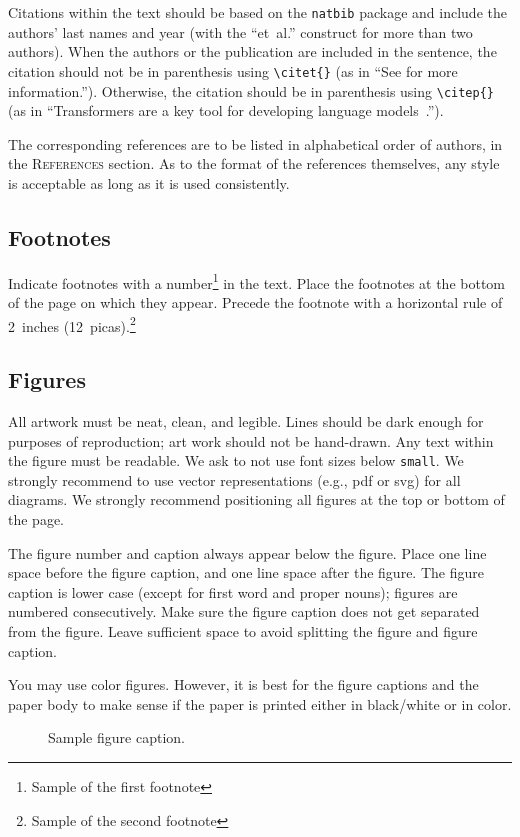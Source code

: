\documentclass{article} %
\begin{document}
Citations within the text should be based on the \texttt{natbib} package
and include the authors' last names and year (with the ``et~al.'' construct
for more than two authors). When the authors or the publication are
included in the sentence, the citation should not be in parenthesis using \verb|\citet{}| (as
in ``See \citet{Vaswani+2017} for more information.''). Otherwise, the citation
should be in parenthesis using \verb|\citep{}| (as in ``Transformers are a key tool
for developing language models~\citep{Vaswani+2017}.'').

The corresponding references are to be listed in alphabetical order of
authors, in the \textsc{References} section. As to the format of the
references themselves, any style is acceptable as long as it is used
consistently.

\subsection{Footnotes}

Indicate footnotes with a number\footnote{Sample of the first footnote} in the
text. Place the footnotes at the bottom of the page on which they appear.
Precede the footnote with a horizontal rule of 2~inches
(12~picas).\footnote{Sample of the second footnote}

\subsection{Figures}

All artwork must be neat, clean, and legible. Lines should be dark
enough for purposes of reproduction; art work should not be
hand-drawn. Any text within the figure must be readable. We ask to not use font sizes below {\tt small}. We strongly recommend to use vector representations (e.g., pdf or svg) for all diagrams. 
We strongly recommend positioning all figures at the top or bottom of the page.

The figure number and caption always appear below the figure. Place one line space before the figure caption, and one line space after the figure. The figure caption is lower case (except for first word and proper nouns); figures are numbered consecutively.
Make sure the figure caption does not get separated from the figure.
Leave sufficient space to avoid splitting the figure and figure caption.

You may use color figures.
However, it is best for the
figure captions and the paper body to make sense if the paper is printed
either in black/white or in color.
\begin{figure}[t]
\begin{center}
\fbox{\rule[-.5cm]{0cm}{4cm} \rule[-.5cm]{4cm}{0cm}}
\end{center}
\caption{Sample figure caption.}
\end{figure}
\end{document}
